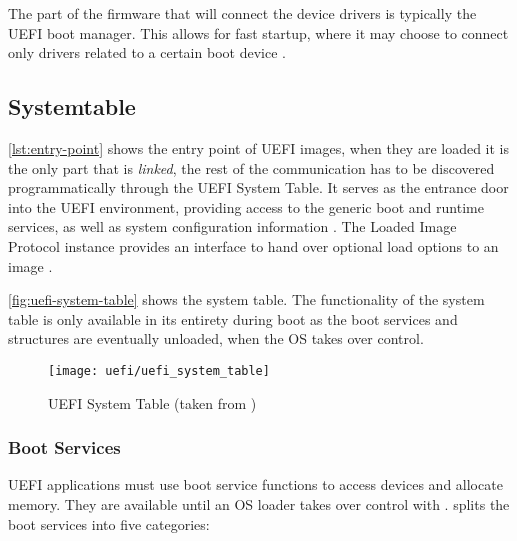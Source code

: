 The part of the firmware that will connect the device drivers is typically the \ac{UEFI} boot manager.
This allows for fast startup, where it may choose to connect only drivers related to a certain boot device \cite[Section 2.5.6]{uefi-spec}.

\subsection{Systemtable}



\autoref{lst:entry-point} shows the entry point of \ac{UEFI} images, when they are loaded it is the only part that is \emph{linked}, the rest of the communication has to be discovered programmatically through the \ac{UEFI} System Table.
It serves as the entrance door into the \ac{UEFI} environment, providing access to the generic boot and runtime services, as well as system configuration information \cite[Section 3.3]{tianocore-edk2-driver-writer-s-guide}.
The Loaded Image Protocol instance provides an interface to hand over optional load options to an image \cite{beyond-bios}.

\autoref{fig:uefi-system-table} shows the system table.
The functionality of the system table is only available in its entirety during boot as the boot services and structures are eventually unloaded, when the \ac{OS} takes over control.

\begin{figure}[htb]%
    \centering%
    \texttt{[image: uefi/uefi\_system\_table]}%
    \caption[\acs{UEFI} System Table]{\acs{UEFI} System Table (taken from \cite[Vol 2, Figure 2-5]{pi-spec})}%
    \label{fig:uefi-system-table}%
\end{figure}

\subsubsection{Boot Services}

\ac{UEFI} applications must use boot service functions to access devices and allocate memory.
They are available until an \ac{OS} loader takes over control with .
\cite[Section 7]{uefi-spec} splits the boot services into five categories:

